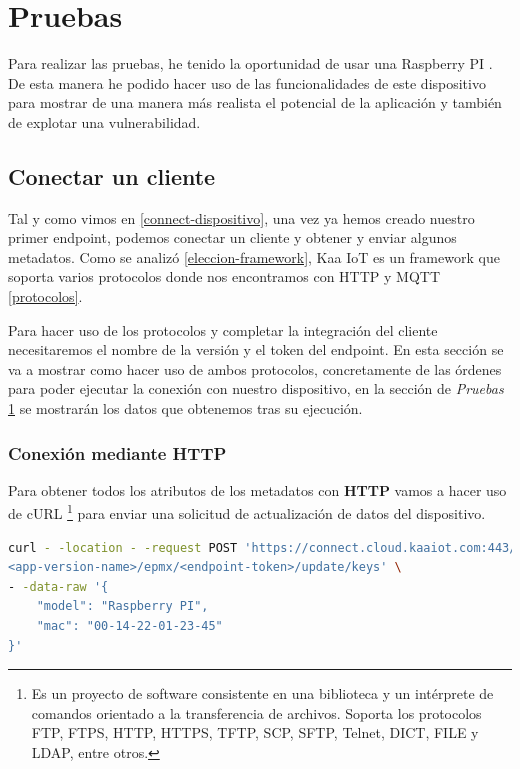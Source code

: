 \chapter{Pruebas} \label{pruebas}

{\color{blue}

Para realizar las pruebas, he tenido la oportunidad de usar una Raspberry PI \cite{raspberry-specs}. De esta manera he podido hacer uso de las funcionalidades de este dispositivo para mostrar de una manera más realista el potencial de la aplicación y también de explotar una vulnerabilidad.

\section{Conectar un cliente}

Tal y como vimos en \ref{connect-dispositivo}, una vez ya hemos creado nuestro primer endpoint, podemos conectar un cliente y obtener y enviar algunos metadatos. Como se analizó \ref{eleccion-framework}, Kaa IoT es un framework que soporta varios protocolos donde nos encontramos con HTTP y MQTT \ref{protocolos}.

Para hacer uso de los protocolos y completar la integración del cliente necesitaremos el nombre de la versión y el token del endpoint. En esta sección se va a mostrar como hacer uso de ambos protocolos, concretamente de las órdenes para poder ejecutar la conexión con nuestro dispositivo, en la sección de \textit{Pruebas} \ref{pruebas} se mostrarán los datos que obtenemos tras su ejecución.\\

\subsection{Conexión mediante HTTP} \label{http-connection}

Para obtener todos los atributos de los metadatos con \textbf{HTTP} vamos a hacer uso de cURL \footnote{Es un proyecto de software consistente en una biblioteca y un intérprete de comandos orientado a la transferencia de archivos. Soporta los protocolos FTP, FTPS, HTTP, HTTPS, TFTP, SCP, SFTP, Telnet, DICT, FILE y LDAP, entre otros.} para enviar una solicitud de actualización de datos del dispositivo.

\begin{lstlisting}[language=bash]
curl - -location - -request POST 'https://connect.cloud.kaaiot.com:443/kp1/
<app-version-name>/epmx/<endpoint-token>/update/keys' \
- -data-raw '{
    "model": "Raspberry PI",
    "mac": "00-14-22-01-23-45"
}'
\end{lstlisting}

}
